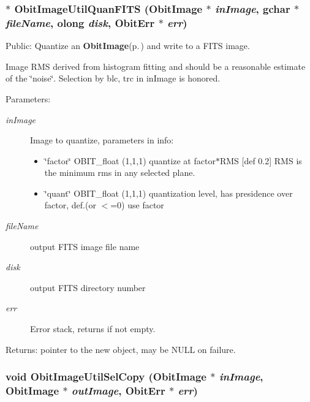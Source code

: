 \subsubsection{$\ast$ Obit\-Image\-Util\-Quan\-FITS ({\bf Obit\-Image} $\ast$ {\em in\-Image}, gchar $\ast$ {\em file\-Name}, {\bf olong} {\em disk}, {\bf Obit\-Err} $\ast$ {\em err})}\label{ObitImageUtil_8h_a14}


Public: Quantize an {\bf Obit\-Image}{\rm (p.\,\pageref{structObitImage})} and write to a FITS image. 

Image RMS derived from histogram fitting and should be a reasonable estimate of the \char`\"{}noise\char`\"{}. Selection by blc, trc in in\-Image is honored. \begin{Desc}
\item[Parameters:]
\begin{description}
\item[{\em in\-Image}]Image to quantize, parameters in info: \begin{itemize}
\item \char`\"{}factor\char`\"{} OBIT\_\-float (1,1,1) quantize at factor$\ast$RMS [def 0.2] RMS is the minimum rms in any selected plane. \item \char`\"{}quant\char`\"{} OBIT\_\-float (1,1,1) quantization level, has presidence over factor, def.(or $<$=0) use factor \end{itemize}
\item[{\em file\-Name}]output FITS image file name \item[{\em disk}]output FITS directory number \item[{\em err}]Error stack, returns if not empty. \end{description}
\end{Desc}
\begin{Desc}
\item[Returns:]pointer to the new object, may be NULL on failure. \end{Desc}
\subsubsection{\setlength{\rightskip}{0pt plus 5cm}void Obit\-Image\-Util\-Sel\-Copy ({\bf Obit\-Image} $\ast$ {\em in\-Image}, {\bf Obit\-Image} $\ast$ {\em out\-Image}, {\bf Obit\-Err} $\ast$ {\em err})}\label{ObitImageUtil_8h_a19}


